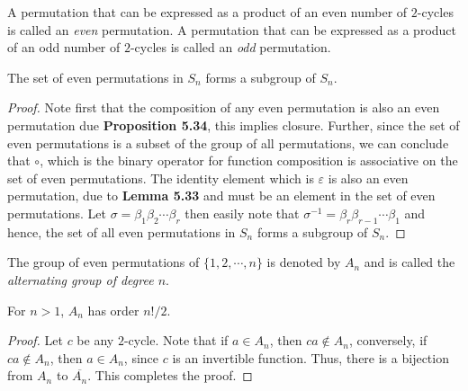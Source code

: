 \begin{definition}
	A permutation that can be expressed as a product of an even number of $2$-cycles is called an \textit{even} permutation. A permutation that can be expressed as a product of an odd number of $2$-cycles is called an \textit{odd} permutation.
\end{definition}

\begin{proposition}
	The set of even permutations in $S_n$ forms a subgroup of $S_n$.
\end{proposition}
\begin{proof}
	Note first that the composition of any even permutation is also an even permutation due \textbf{Proposition 5.34}, this implies closure. Further, since the set of even permutations is a subset of the group of all permutations, we can conclude that $\circ$, which is the binary operator for function composition is associative on the set of even permutations. The identity element which is $\varepsilon$ is also an even permutation, due to \textbf{Lemma 5.33} and must be an element in the set of even permutations. Let $\sigma=\beta_1\beta_2\cdots\beta_r$ then easily note that $\sigma^{-1}=\beta_r\beta_{r-1}\cdots\beta_1$ and hence, the set of all even permutations in $S_n$ forms a subgroup of $S_n$.
\end{proof}

\begin{definition}
	The group of even permutations of $\{1,2,\cdots,n\}$ is denoted by $A_n$ and is called the \textit{alternating group of degree $n$}.
\end{definition}

\begin{proposition}
	For $n>1$, $A_n$ has order $n!/2$.
\end{proposition}
\begin{proof}
	Let $c$ be any $2$-cycle. Note that if $a\in A_n$, then $ca\notin A_n$, conversely, if $ca\notin A_n$, then $a\in A_n$, since $c$ is an invertible function. Thus, there is a bijection from $A_n$ to $\overline{A_n}$. This completes the proof.
\end{proof}